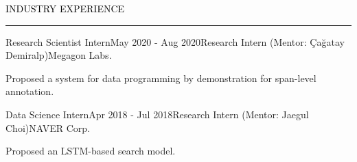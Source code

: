 \documentclass{resume} %
\renewenvironment{rSection}[1]{
	\sectionskip
	\textcolor{Black}{\MakeUppercase{#1}}
	\sectionlineskip
	\hrule
	\begin{list}{}{
			\setlength{\leftmargin}{1.5em}
		}
		\item[]
	}{
	\end{list}
}
\begin{document}
\vspace*{-1.0mm}
\begin{rSection}{Industry Experience}
\begin{rSubsection}{Research Scientist Intern}{May 2020 - Aug 2020}{Research Intern (Mentor: Çağatay Demiralp)}{Megagon Labs.}
	\item Proposed a system for data programming by demonstration for span-level annotation.
\end{rSubsection}
\vspace*{-2.5mm}
\begin{rSubsection}{Data Science Intern}{Apr 2018 - Jul 2018}{Research Intern (Mentor: Jaegul Choi)}{NAVER Corp.}
	\item Proposed an LSTM-based search model.
\end{rSubsection}

\end{rSection}



%	
\end{document}
